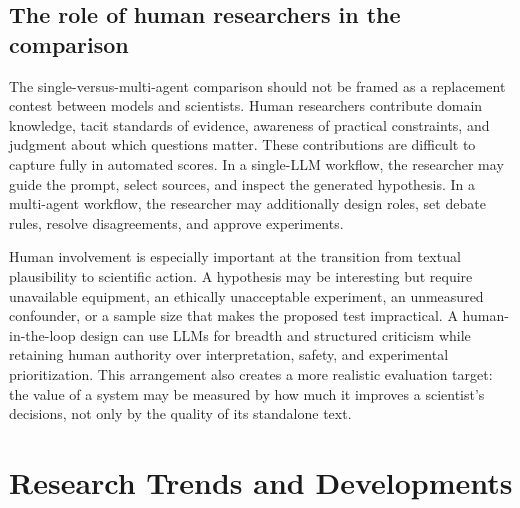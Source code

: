 \documentclass[11pt]{article}
\begin{document}
\subsection{The role of human researchers in the comparison}
\label{subsec:human-researchers}

The single-versus-multi-agent comparison should not be framed as a replacement contest between
models and scientists. Human researchers contribute domain knowledge, tacit standards of
evidence, awareness of practical constraints, and judgment about which questions matter. These
contributions are difficult to capture fully in automated scores. In a single-LLM workflow, the
researcher may guide the prompt, select sources, and inspect the generated hypothesis. In a
multi-agent workflow, the researcher may additionally design roles, set debate rules, resolve
disagreements, and approve experiments.

Human involvement is especially important at the transition from textual plausibility to scientific
action. A hypothesis may be interesting but require unavailable equipment, an ethically
unacceptable experiment, an unmeasured confounder, or a sample size that makes the proposed test
impractical. A human-in-the-loop design can use LLMs for breadth and structured criticism while
retaining human authority over interpretation, safety, and experimental prioritization. This
arrangement also creates a more realistic evaluation target: the value of a system may be measured
by how much it improves a scientist's decisions, not only by the quality of its standalone text.

\section{Research Trends and Developments}
\label{sec:research-trends}
\end{document}
